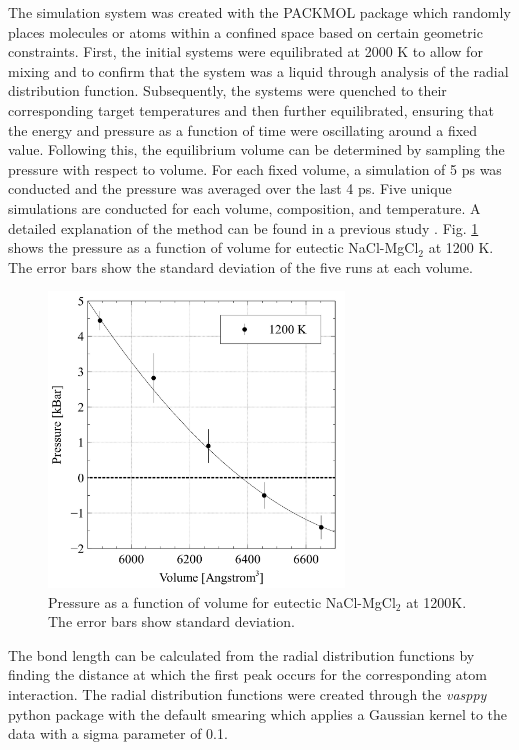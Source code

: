 \documentclass[review]{elsarticle}
\begin{document}
The simulation system was created with the PACKMOL package \cite{martinez2009} which randomly places molecules or atoms within a confined space based on certain geometric constraints. First, the initial systems were equilibrated at 2000 K to allow for mixing and to confirm that the system was a liquid through analysis of the radial distribution function. Subsequently, the systems were quenched to their corresponding target temperatures and then further equilibrated, ensuring that the energy and pressure as a function of time were oscillating around a fixed value. Following this, the equilibrium volume can be determined by sampling the pressure with respect to volume. For each fixed volume, a simulation of 5 ps was conducted and the pressure was averaged over the last 4 ps. Five unique simulations are conducted for each volume, composition, and temperature. A detailed explanation of the method can be found in a previous study \cite{Duemmler2021}. Fig. \ref{fig:PVV} shows the pressure as a function of volume for eutectic NaCl-MgCl$_2$ at 1200 K. The error bars show the standard deviation of the five runs at each volume.

\begin{figure}[h]
 \centering
 \includegraphics[width=0.7\textwidth]{images/PressureVsVolume.jpg} 
 \caption{Pressure as a function of volume for eutectic NaCl-MgCl$_2$ at 1200K. The error bars show standard deviation.}
 \label{fig:PVV}
\end{figure} 

The bond length can be calculated from the radial distribution functions by finding the distance at which the first peak occurs for the corresponding atom interaction. The radial distribution functions were created through the \textit{vasppy} python package with the default smearing which applies a Gaussian kernel to the data with a sigma parameter of 0.1. 
\end{document}
